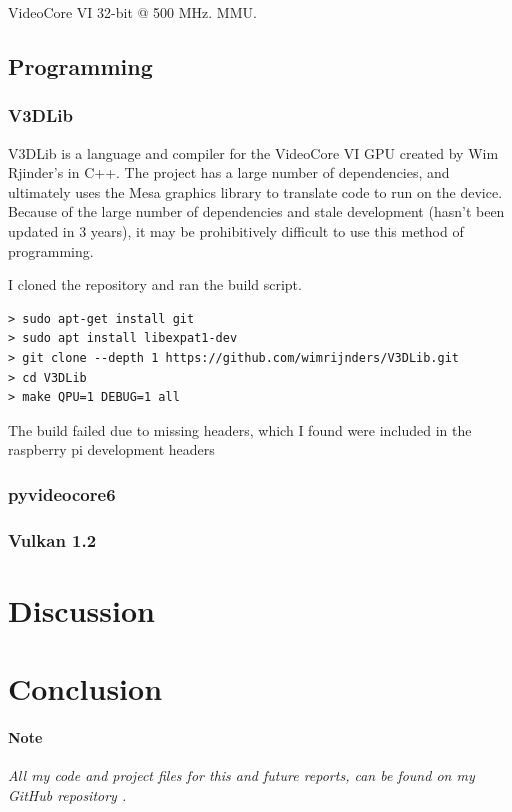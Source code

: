 \documentclass[12pt]{article}
\begin{document}
VideoCore VI 32-bit @ 500 MHz.
MMU.

\subsection{Programming}

\subsubsection{V3DLib}

V3DLib is a language and compiler for the VideoCore VI GPU created by Wim Rjinder's in C++. The project has a large number of dependencies, and ultimately uses the Mesa graphics library to translate code to run on the device. Because of the large number of dependencies and stale development (hasn't been updated in 3 years), it may be prohibitively difficult to use this method of programming. 

I cloned the repository and ran the build script.
	
\begin{lstlisting}
> sudo apt-get install git                                     
> sudo apt install libexpat1-dev                                
> git clone --depth 1 https://github.com/wimrijnders/V3DLib.git  
> cd V3DLib
> make QPU=1 DEBUG=1 all                                
\end{lstlisting}

The build failed due to missing headers, which I found were included in the raspberry pi development headers

\subsubsection{pyvideocore6}

\subsubsection{Vulkan 1.2}

\section{Discussion}\label{sec:discussion}

\section{Conclusion}\label{sec:conclusion}
\paragraph{Note}
\textit{All my code and project files for this and future reports, can be found on my GitHub repository \cite{lybbert2024classwork}.}



\end{document}
